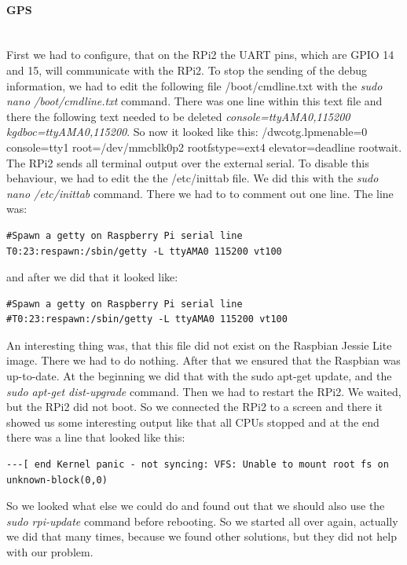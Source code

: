 \paragraph{GPS} \mbox{}\\
First we had to configure, that on the RPi2 the UART pins, which are GPIO 14 and 15, will communicate with the RPi2.\newline
To stop the sending of the debug information, we had to edit the following file /boot/cmdline.txt with the \textit{sudo nano /boot/cmdline.txt} command.\newline
There was one line within this text file and there the following text needed to be deleted \textit{console=ttyAMA0,115200 kgdboc=ttyAMA0,115200}.\newline
So now it looked like this: /dwc\textunderscore otg.lpm\textunderscore enable=0 console=tty1 root=/dev/mmcblk0p2 rootfstype=ext4 elevator=deadline rootwait.\newline
The RPi2 sends all terminal output over the external serial. To disable this behaviour, we had to edit the the /etc/inittab file. We did this with the \textit{sudo nano /etc/inittab} command.\newline
There we had to to comment out one line. The line was:
\begin{verbatim}
#Spawn a getty on Raspberry Pi serial line
T0:23:respawn:/sbin/getty -L ttyAMA0 115200 vt100
\end{verbatim}
and after we did that it looked like:
\begin{verbatim}
#Spawn a getty on Raspberry Pi serial line
#T0:23:respawn:/sbin/getty -L ttyAMA0 115200 vt100
\end{verbatim}
An interesting thing was, that this file did not exist on the Raspbian Jessie Lite image. There we had to do nothing.\newline
After that we ensured that the Raspbian was up-to-date. At the beginning we did that with the sudo apt-get update, and the \textit{sudo apt-get dist-upgrade} command. Then we had to restart the RPi2. We waited, but the RPi2 did not boot. So we connected the RPi2 to a screen and there it showed us some interesting output like that all CPUs stopped and at the end there was a line that looked like this: \newline
\begin{verbatim}
---[ end Kernel panic - not syncing: VFS: Unable to mount root fs on unknown-block(0,0)
\end{verbatim}
So we looked what else we could do and found out that we should also use the \textit{sudo rpi-update} command before rebooting. So we started all over again, actually we did that many times, because we found other solutions, but they did not help with our problem. \newline
